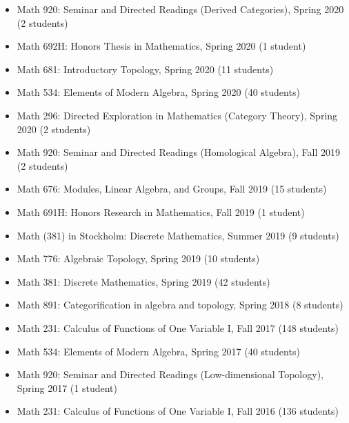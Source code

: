 \documentclass[10pt]{article}
\begin{document}
\begin{itemize}
\item Math 920: Seminar and Directed Readings (Derived Categories), Spring 2020 (2 students)
\item Math 692H: Honors Thesis in Mathematics, Spring 2020 (1 student)
\item Math 681: Introductory Topology, Spring 2020 (11 students) %
\item Math 534: Elements of Modern Algebra, Spring 2020 (40 students)
\item Math 296: Directed Exploration in Mathematics (Category Theory), Spring 2020 (2 students)
\item Math 920: Seminar and Directed Readings (Homological Algebra), Fall 2019 (2 students)
\item Math 676: Modules, Linear Algebra, and Groups, Fall 2019 (15 students) %
\item Math 691H: Honors Research in Mathematics, Fall 2019 (1 student)
\item Math (381) in Stockholm: Discrete Mathematics, Summer 2019 (9 students)
\item Math 776: Algebraic Topology, Spring 2019 (10 students) %
\item Math 381: Discrete Mathematics, Spring 2019 (42 students) %
\item Math 891: Categorification in algebra and topology, Spring 2018 (8 students) %
\item Math 231: Calculus of Functions of One Variable I, Fall 2017 (148 students)
\item Math 534: Elements of Modern Algebra, Spring 2017 (40 students) %
\item Math 920: Seminar and Directed Readings (Low-dimensional Topology), Spring 2017 (1 student)
\item Math 231: Calculus of Functions of One Variable I, Fall 2016 (136 students) %
\end{itemize}
\end{document}

